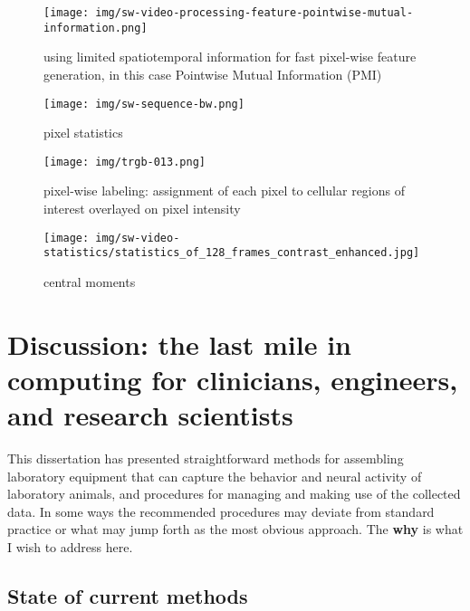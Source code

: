 \documentclass[
  12pt,
]{report}
\numberwithin{figure}{section}
\numberwithin{table}{section}
\numberwithin{equations}{section}
\begin{document}
\begin{figure}
\centering
\texttt{[image: img/sw-video-processing-feature-pointwise-mutual-information.png]}
\caption{using limited spatiotemporal information for fast pixel-wise
feature generation, in this case Pointwise Mutual Information (PMI)}
\end{figure}

\begin{figure}
\centering
\texttt{[image: img/sw-sequence-bw.png]}
\caption{pixel statistics}
\end{figure}

\begin{figure}
\centering
\texttt{[image: img/trgb-013.png]}
\caption{pixel-wise labeling: assignment of each pixel to cellular
regions of interest overlayed on pixel intensity}
\end{figure}

\begin{figure}
\centering
\texttt{[image: img/sw-video-statistics/statistics\_of\_128\_frames\_contrast\_enhanced.jpg]}
\caption{central moments}
\end{figure}

\hypertarget{discussion-the-last-mile-in-computing-for-clinicians-engineers-and-research-scientists}{%
\chapter{Discussion: the last mile in computing for clinicians,
engineers, and research
scientists}\label{discussion-the-last-mile-in-computing-for-clinicians-engineers-and-research-scientists}}

This dissertation has presented straightforward methods for assembling
laboratory equipment that can capture the behavior and neural activity
of laboratory animals, and procedures for managing and making use of the
collected data. In some ways the recommended procedures may deviate from
standard practice or what may jump forth as the most obvious approach.
The \textbf{why} is what I wish to address here.

\hypertarget{state-of-current-methods}{%
\section{State of current methods}\label{state-of-current-methods}}
\end{document}
